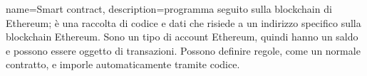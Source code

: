{
	name={Smart contract},
	description={programma seguito sulla blockchain di Ethereum; è una raccolta di codice e dati che risiede a un indirizzo specifico sulla blockchain Ethereum. Sono un tipo di account Ethereum, quindi hanno un saldo e possono essere oggetto di transazioni. Possono definire regole, come un normale contratto, e imporle automaticamente tramite codice.}
}